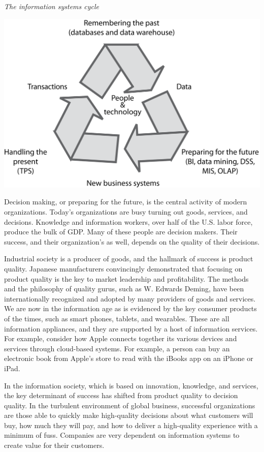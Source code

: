 \documentclass[
]{article}
\begin{document}
\emph{The information systems cycle}

\includegraphics{Figures/Chapter 1/IS cycle.png}

Decision making, or preparing for the future, is the central activity of
modern organizations. Today's organizations are busy turning out goods,
services, and decisions. Knowledge and information workers, over half of
the U.S. labor force, produce the bulk of GDP. Many of these people are
decision makers. Their success, and their organization's as well,
depends on the quality of their decisions.

Industrial society is a producer of goods, and the hallmark of success
is product quality. Japanese manufacturers convincingly demonstrated
that focusing on product quality is the key to market leadership and
profitability. The methods and the philosophy of quality gurus, such as
W. Edwards Deming, have been internationally recognized and adopted by
many providers of goods and services. We are now in the information age
as is evidenced by the key consumer products of the times, such as smart
phones, tablets, and wearables. These are all information appliances,
and they are supported by a host of information services. For example,
consider how Apple connects together its various devices and services
through cloud-based systems. For example, a person can buy an electronic
book from Apple's store to read with the iBooks app on an iPhone or
iPad.

In the information society, which is based on innovation, knowledge, and
services, the key determinant of success has shifted from product
quality to decision quality. In the turbulent environment of global
business, successful organizations are those able to quickly make
high-quality decisions about what customers will buy, how much they will
pay, and how to deliver a high-quality experience with a minimum of
fuss. Companies are very dependent on information systems to create
value for their customers.
\end{document}
